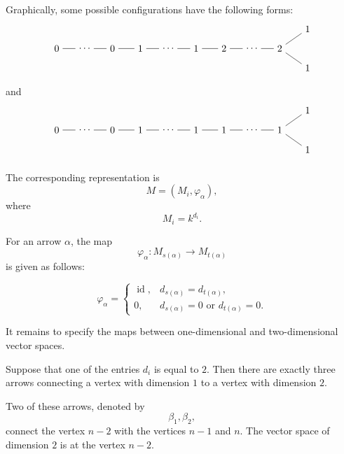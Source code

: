 \documentclass[11pt, a4paper]{report}
\begin{document}
Graphically, some possible configurations have the following forms:
\[
\begin{tikzpicture}[>=Stealth,scale=1]
    \node (a1) at (0,0) {\(0\)};
    \node (a2) at (1,0) {\(\cdots\)};
    \node (a3) at (2,0) {\(0\)};
    \node (b1) at (3,0) {\(1\)};
    \node (b2) at (4,0) {\(\cdots\)};
    \node (b3) at (5,0) {\(1\)};
    \node (c1) at (6,0) {\(2\)};
    \node (c2) at (7,0) {\(\cdots\)};
    \node (c3) at (8,0) {\(2\)};
    \node (u) at (9,0.7) {\(1\)};
    \node (v) at (9,-0.7) {\(1\)};

    \draw (a1) -- (a2) -- (a3) -- (b1) -- (b2) -- (b3) -- (c1) -- (c2) -- (c3);
    \draw (c3) -- (u);
    \draw (c3) -- (v);
\end{tikzpicture}
\]
and
\[
\begin{tikzpicture}[>=Stealth,scale=1]
    \node (a1) at (0,0) {\(0\)};
    \node (a2) at (1,0) {\(\cdots\)};
    \node (a3) at (2,0) {\(0\)};
    \node (b1) at (3,0) {\(1\)};
    \node (b2) at (4,0) {\(\cdots\)};
    \node (b3) at (5,0) {\(1\)};
    \node (c1) at (6,0) {\(1\)};
    \node (c2) at (7,0) {\(\cdots\)};
    \node (c3) at (8,0) {\(1\)};
    \node (u) at (9,0.7) {\(1\)};
    \node (v) at (9,-0.7) {\(1\)};

    \draw (a1) -- (a2) -- (a3) -- (b1) -- (b2) -- (b3) -- (c1) -- (c2) -- (c3);
    \draw (c3) -- (u);
    \draw (c3) -- (v);
\end{tikzpicture}
\]

The corresponding representation is
\[
    M=(M_i,\varphi_\alpha),
\]
where
\[
    M_i=k^{d_i}.
\]

For an arrow \(\alpha\), the map
\[
    \varphi_\alpha:M_{s(\alpha)}\longrightarrow M_{t(\alpha)}
\]
is given as follows:

\[
    \varphi_\alpha=
    \begin{cases}
        \operatorname{id}, & d_{s(\alpha)}=d_{t(\alpha)},\\[1mm]
        0, & d_{s(\alpha)}=0 \text{ or } d_{t(\alpha)}=0.
    \end{cases}
\]

It remains to specify the maps between one-dimensional and two-dimensional
vector spaces.

Suppose that one of the entries \(d_i\) is equal to \(2\). Then there are exactly
three arrows connecting a vertex with dimension \(1\) to a vertex with dimension
\(2\).

Two of these arrows, denoted by
\[
    \beta_1,\beta_2,
\]
connect the vertex \(n-2\) with the vertices \(n-1\) and \(n\). The vector space
of dimension \(2\) is at the vertex \(n-2\).
\end{document}
